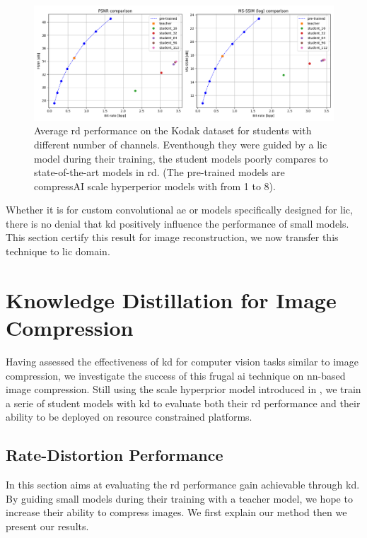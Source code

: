 \begin{figure}
    \centering
    \includegraphics[width=15cm]{../img/kd_ae_rd.png}
    \caption[Average \acrshort{rd} performance on the Kodak dataset for students with different number of channels.]{Average \acrshort{rd} performance on the Kodak dataset for students with different number of channels. Eventhough they were guided by a \acrshort{lic} model during their training, the student models poorly compares to state-of-the-art models in \acrshort{rd}. (The pre-trained models are compressAI scale hyperperior models with  from 1 to 8).}
    \label{kd_ae_2}
\end{figure}

Whether it is for custom convolutional \acrshort{ae} or models specifically designed for \acrshort{lic}, there is no denial that \acrshort{kd} positively influence the performance of small models. This section certify this result for image reconstruction, we now transfer this technique to \acrshort{lic} domain.

\section{Knowledge Distillation for Image Compression}
Having assessed the effectiveness of \acrshort{kd} for computer vision tasks similar to image compression, we investigate the success of this frugal \acrshort{ai} technique on \acrshort{nn}-based image compression. Still using the scale hyperprior model introduced in \cite{ballé2018variationalimagecompressionscale}, we train a serie of student models with \acrshort{kd} to evaluate both their \acrshort{rd} performance and their ability to be deployed on resource constrained platforms.

\subsection{Rate-Distortion Performance}
In this section aims at evaluating the \acrshort{rd} performance gain achievable through \acrshort{kd}. By guiding small models during their training with a teacher model, we hope to increase their ability to compress images. We first explain our method then we present our results.

